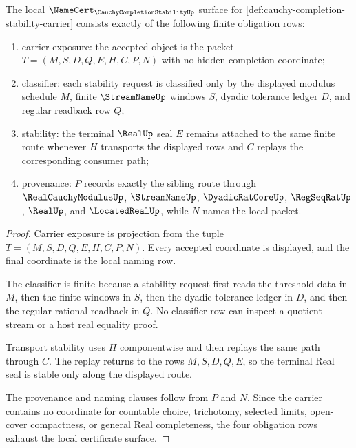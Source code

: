 \begin{theorem}
\label{thm:cauchy-completion-stability-namecert-obligations}
The local $\NameCert_{\CauchyCompletionStabilityUp}$ surface for \autoref{def:cauchy-completion-stability-carrier} consists exactly of the following finite obligation rows:
\begin{enumerate}
\item carrier exposure: the accepted object is the packet $T=(M,S,D,Q,E,H,C,P,N)$ with no hidden completion coordinate;
\item classifier: each stability request is classified only by the displayed modulus schedule $M$, finite $\StreamNameUp$ windows $S$, dyadic tolerance ledger $D$, and regular readback row $Q$;
\item stability: the terminal $\RealUp$ seal $E$ remains attached to the same finite route whenever $H$ transports the displayed rows and $C$ replays the corresponding consumer path;
\item provenance: $P$ records exactly the sibling route through $\RealCauchyModulusUp$, $\StreamNameUp$, $\DyadicRatCoreUp$, $\RegSeqRatUp$, $\RealUp$, and $\LocatedRealUp$, while $N$ names the local packet.
\end{enumerate}
\end{theorem}
\begin{proof}
Carrier exposure is projection from the tuple $T=(M,S,D,Q,E,H,C,P,N)$. Every accepted coordinate is displayed, and the final coordinate is the local naming row.

The classifier is finite because a stability request first reads the threshold data in $M$, then the finite windows in $S$, then the dyadic tolerance ledger in $D$, and then the regular rational readback in $Q$. No classifier row can inspect a quotient stream or a host real equality proof.

Transport stability uses $H$ componentwise and then replays the same path through $C$. The replay returns to the rows $M,S,D,Q,E$, so the terminal Real seal is stable only along the displayed route.

The provenance and naming clauses follow from $P$ and $N$. Since the carrier contains no coordinate for countable choice, trichotomy, selected limits, open-cover compactness, or general Real completeness, the four obligation rows exhaust the local certificate surface.
\end{proof}

